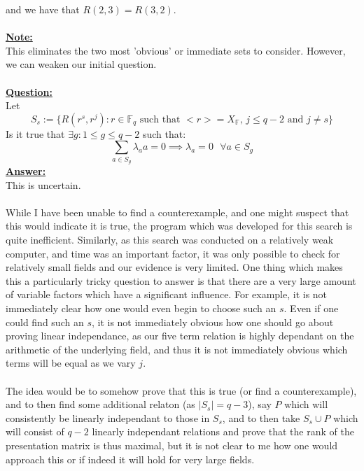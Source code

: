 \documentclass[11pt]{article}
\theoremstyle{plain}
\theoremstyle{definition}
\begin{document}
and we have that $R(2,3) = R(3,2)$.\\
\\
\textbf{\underline{Note:}}\\ This eliminates the two most 'obvious' or immediate sets to consider. However, we can weaken our initial question. \\
\\
\textbf{\underline{Question:}}\\ Let
\begin{equation*}
S_s := \{R(r^s, r^j) : r \in \mathbb{F}_q \text{ such that } <r> = X_{\mathbb{F}} \text{, } j \leq q-2 \text{ and } j\neq s\}
\end{equation*}
Is it true that $\exists g : 1 \leq g \leq q-2$ such that:
\begin{equation*} 
\sum_{a \in S_g} \lambda_a a = 0 \implies \lambda_a=0 \text{ } \forall  a \in S_g
\end{equation*}
\textbf{\underline{Answer:}}\\ This is uncertain.\\
\\
 While I have been unable to find a counterexample, and one might suspect that this would indicate it is true, the program which was developed for this search is quite inefficient. Similarly, as this search was conducted on a relatively weak computer, and time was an important factor, it was only possible to check for relatively small fields and our evidence is very limited. One thing which makes this a particularly tricky question to answer is that there are a very large amount of variable factors which have a significant influence. For example, it is not immediately clear how one would even begin to choose such an $s$. Even if one could find such an $s$, it is not immediately obvious how one should go about proving linear independance, as our five term relation is highly dependant on the arithmetic of the underlying field, and thus it is not immediately obvious which terms will be equal as we vary $j$.\\
\\
The idea would be to somehow prove that this is true (or find a counterexample), and to then find some additional relaton (as $|S_s| = q-3$), say $P$ which will consistently be linearly independant to those in $S_s$, and to then take $S_s \cup P$ which will consist of $q-2$ linearly independant relations and prove that the rank of the presentation matrix is thus maximal, but it is not clear to me how one would approach this or if indeed it will hold for very large fields.\\
\end{document}
